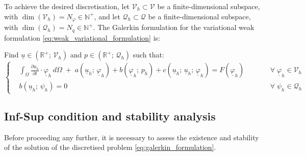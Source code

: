 \documentclass[11pt,a4paper]{article}
\newcommand{\R}{\mathds{R}}
\renewcommand{\vec}[1]{\underline{#1}} %
\let\oldforall\forall
\renewcommand{\forall}{\oldforall \; }
\begin{document}
To achieve the desired discretisation, let $\mathcal{V}_{h} \subset \mathcal{V}$ be a finite-dimensional subspace, with $\dim(\mathcal{V}_{h}) = N_{\varphi} \in \mathbb{N}^{+}$, and let $\mathcal{Q}_{h} \subset \mathcal{Q}$ be a finite-dimensional subspace, with $\dim(\mathcal{Q}_{h}) = N_{q} \in \mathbb{N}^{+}$. The Galerkin formulation for the variational weak formulation \eqref{eq:weak_variational_formulation} is: 
\begin{tcolorbox}[colback = bluePoli!10, colframe=bluePoli]
    Find $\vec{u} \in (\R^{+}; \, \mathcal{V}_{h})$ and $p \in (\R^{+}; \, \mathcal{Q}_{h})$ such that: 
    \begin{equation}
        \label{eq:galerkin_formulation}
        \left\{ \begin{aligned}
                            &\int_{\Omega} \frac{\partial \vec{u}_{h}}{\partial t} \cdot \vec{\varphi}_{h} \,  d\Omega \; + \; a\left(\vec{u}_{h}; \, \vec{\varphi}_{h} \right) +  b\left(\vec{\varphi}_{h}; \, p_{h} \right) + c \left(\vec{u}_{h}; \,  \vec{u}_{h}; \,  \vec{\varphi}_{h} \right) = F\left( \vec{\varphi}_{h} \right) \qquad &&\forall \vec{\varphi}_{h} \in \mathcal{V}_{h} \\
                            &b \left(\vec{u}_{h}; \, \psi_{h} \right) = 0  &&\forall \psi_{h} \in \mathcal{Q}_{h}
                \end{aligned} \right.
    \end{equation}
\end{tcolorbox}

\subsection{Inf-Sup condition and stability analysis}
Before proceeding any further, it is necessary to assess the existence and stability of the solution of the discretised problem \eqref{eq:galerkin_formulation}.
\end{document}

